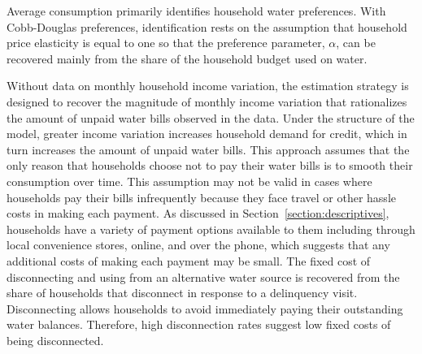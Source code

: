\documentclass[12pt]{article}
\begin{document}
Average consumption primarily identifies household water preferences.  With Cobb-Douglas preferences, identification rests on the assumption that household price elasticity is equal to one so that the preference parameter, $\alpha$, can be recovered mainly from the share of the household budget used on water.

Without data on monthly household income variation, the estimation strategy is designed to recover the magnitude of monthly income variation that rationalizes the amount of unpaid water bills observed in the data.  Under the structure of the model, greater income variation increases household demand for credit, which in turn increases the amount of unpaid water bills.  This approach assumes that the only reason that households choose not to pay their water bills is to smooth their consumption over time.  This assumption may not be valid in cases where households pay their bills infrequently because they face travel or other hassle costs in making each payment.  As discussed in Section~\ref{section:descriptives}, households have a variety of payment options available to them including through local convenience stores, online, and over the phone, which suggests that any additional costs of making each payment may be small. %
The fixed cost of disconnecting and using from an alternative water source is recovered from the share of households that disconnect in response to a delinquency visit.  Disconnecting allows households to avoid immediately paying their outstanding water balances.  Therefore, high disconnection rates suggest low fixed costs of being disconnected.
\end{document}
